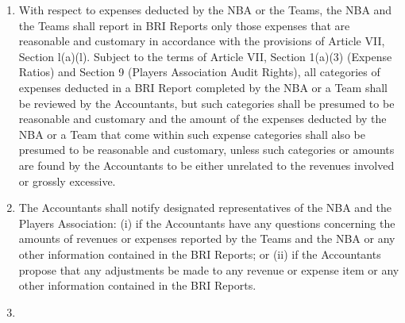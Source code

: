 \documentclass[
]{book}
\begin{document}
\begin{enumerate}
\item
  With respect to expenses deducted by the NBA or the Teams, the NBA and the Teams shall report in BRI Reports only those expenses that are reasonable and customary in accordance with the provisions of Article VII, Section l(a)(l). Subject to the terms of Article VII, Section 1(a)(3) (Expense Ratios) and Section 9 (Players Association Audit Rights), all categories of expenses deducted in a BRI Report completed by the NBA or a Team shall be reviewed by the Accountants, but such categories shall be presumed to be reasonable and customary and the amount of the expenses deducted by the NBA or a Team that come within such expense categories shall also be presumed to be reasonable and customary, unless such categories or amounts are found by the Accountants to be either unrelated to the revenues involved or grossly excessive.
\item
  The Accountants shall notify designated representatives of the NBA and the Players Association: (i) if the Accountants have any questions concerning the amounts of revenues or expenses reported by the Teams and the NBA or any other information contained in the BRI Reports; or (ii) if the Accountants propose that any adjustments be made to any revenue or expense item or any other information contained in the BRI Reports.
\item

\end{enumerate}
\end{document}
